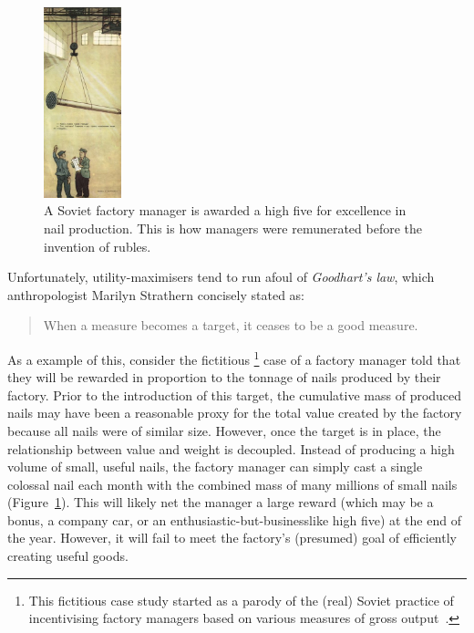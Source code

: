 \documentclass[11pt]{article}
\begin{document}
\begin{figure}
  \vspace{-2em}
  \begin{center}
    \includegraphics[width=0.2\textwidth]{figures/soviet-nail.jpg}
  \end{center}
  \vspace{-1.5em}
  \caption{
    A Soviet factory manager is awarded a high five for excellence in nail
    production.
    This is how managers were remunerated before the invention of
    rubles.
  }
  \label{fig:nail}
\end{figure}

Unfortunately, utility-maximisers tend to run afoul of \textit{Goodhart's law},
which anthropologist Marilyn Strathern concisely stated as:
%
\begin{quote}
  When a measure becomes a target, it ceases to be a good measure.
\end{quote}
%
As a example of this, consider the fictitious%
\footnote{
  This fictitious case study started as a parody of the (real) Soviet practice
  of incentivising factory managers based on various measures of gross
  output~\cite{roberts02time}.
}
case
of a factory manager told that they will be rewarded in proportion to the
tonnage of nails produced by their factory.
%
Prior to the introduction of this target, the cumulative mass of produced nails
may have been a reasonable proxy for the total value created by the factory
because all nails were of similar size.
%
However, once the target is in place, the relationship between value and weight
is decoupled.
%
Instead of producing a high volume of small, useful nails, the factory manager
can simply cast a single colossal nail each month with the combined mass of many
millions of small nails (Figure~\ref{fig:nail}).
%
This will likely net the manager a large reward (which may be a bonus, a company
car, or an enthusiastic-but-businesslike high five) at the end of the year.
%
However, it will fail to meet the factory's (presumed) goal of efficiently
creating useful goods.
\end{document}
